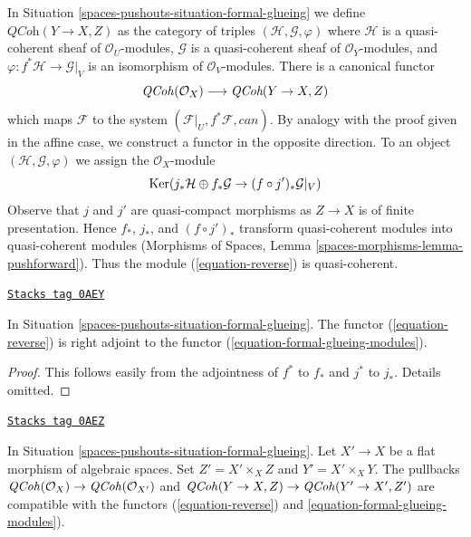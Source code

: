In Situation \ref{spaces-pushouts-situation-formal-glueing} we define
$\textit{QCoh}(Y \to X, Z)$ as the category of
triples $(\mathcal{H}, \mathcal{G}, \varphi)$ where
$\mathcal{H}$ is a quasi-coherent sheaf of
$\mathcal{O}_U$-modules, $\mathcal{G}$ is a quasi-coherent sheaf
of $\mathcal{O}_Y$-modules, and
$\varphi : f^*\mathcal{H} \to \mathcal{G}|_V$ is an isomorphism
of $\mathcal{O}_V$-modules. There is a canonical
functor
\begin{equation}
\label{equation-formal-glueing-modules}
\mathit{QCoh}(\mathcal{O}_X) \longrightarrow \textit{QCoh}(Y \to X, Z)
\end{equation}
which maps $\mathcal{F}$ to the system
$(\mathcal{F}|_U, f^*\mathcal{F}, can)$.
By analogy with the proof given in the affine case, we construct
a functor in the opposite direction. To an object
$(\mathcal{H}, \mathcal{G}, \varphi)$ we assign the $\mathcal{O}_X$-module
\begin{equation}
\label{equation-reverse}
\operatorname{Ker}(j_*\mathcal{H} \oplus f_*\mathcal{G} \to (f \circ j')_*\mathcal{G}|_V)
\end{equation}
Observe that $j$ and $j'$ are quasi-compact morphisms as
$Z \to X$ is of finite presentation. Hence $f_*$, $j_*$, and $(f \circ j')_*$
transform quasi-coherent modules into quasi-coherent modules
(Morphisms of Spaces, Lemma \ref{spaces-morphisms-lemma-pushforward}).
Thus the module (\ref{equation-reverse}) is quasi-coherent.

\begin{lemma}[Adjoint]
\label{spaces-pushouts-lemma-adjoint}
\href{https://stacks.math.columbia.edu/tag/0AEY}{\texttt{Stacks tag 0AEY}}

In Situation \ref{spaces-pushouts-situation-formal-glueing}.
The functor (\ref{equation-reverse}) is right adjoint to
the functor (\ref{equation-formal-glueing-modules}).
\end{lemma}

\begin{proof}
This follows easily from the adjointness of $f^*$ to $f_*$
and $j^*$ to $j_*$. Details omitted.
\end{proof}

\begin{lemma}
\label{spaces-pushouts-lemma-reverse-commutes-with-flat-base-change}
\href{https://stacks.math.columbia.edu/tag/0AEZ}{\texttt{Stacks tag 0AEZ}}

In Situation \ref{spaces-pushouts-situation-formal-glueing}.
Let $X' \to X$ be a flat morphism of algebraic spaces.
Set $Z' = X' \times_X Z$ and $Y' = X' \times_X Y$.
The pullbacks $\mathit{QCoh}(\mathcal{O}_X) \to \mathit{QCoh}(\mathcal{O}_{X'})$
and $\mathit{QCoh}(Y \to X, Z) \to \mathit{QCoh}(Y' \to X', Z')$ are compatible
with the functors (\ref{equation-reverse}) and
\ref{equation-formal-glueing-modules}).
\end{lemma}

